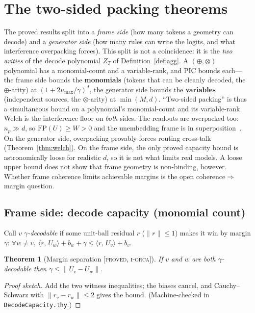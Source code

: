 \documentclass[11pt]{article}
\theoremstyle{definition}
\theoremstyle{plain}
\newtheorem{theorem}{Theorem}[section]
\theoremstyle{remark}
\newcommand{\proved}{\textsc{[proved, i-orca]}}
\newcommand{\inner}[2]{\langle #1,\, #2\rangle}
\newcommand{\umax}{u_{\max}}
\begin{document}
\section{The two-sided packing theorems}\label{sec:thm}

The proved results split into a \emph{frame side} (how many tokens a geometry can decode) and a
\emph{generator side} (how many rules can write the logits, and what interference overpacking forces).
This split is not a coincidence: it is the \emph{two arities} of the decode polynomial $Z_T$ of
Definition~\ref{def:agg}. A $(\oplus,\otimes)$ polynomial has a monomial-count and a variable-rank, and
PIC bounds each---the frame side bounds the \textbf{monomials} (tokens that can be cleanly decoded, the
$\oplus$-arity) at $(1+2\umax/\gamma)^d$, the generator side bounds the \textbf{variables} (independent
sources, the $\otimes$-arity) at $\min(M,d)$. ``Two-sided packing'' is thus a simultaneous bound on a
polynomial's monomial-count and its variable-rank. Welch is the interference floor on \emph{both} sides.
The readouts are overpacked too: $n_p\gg d$, so $\mathrm{FP}(U)\ge W>0$ and the unembedding frame is in
superposition~\cite{elhage2022superposition}. On the generator side, overpacking provably forces routing cross-talk
(Theorem~\ref{thm:welch}). On the frame side, the only proved capacity bound is astronomically loose for
realistic $d$, so it is not what limits real models. A loose upper bound does not show that frame geometry
is non-binding, however. Whether frame coherence limits achievable margins is the open
coherence$\Rightarrow$margin question.

\subsection{Frame side: decode capacity (monomial count)}

Call $v$ \emph{$\gamma$-decodable} if some unit-ball residual $r$ ($\lVert r\rVert\le1$) makes it win by
margin $\gamma$: $\forall w\neq v,\ \inner{r}{U_w}+b_w+\gamma\le\inner{r}{U_v}+b_v$.

\begin{theorem}[Margin separation \proved{}]\label{thm:sep}
If $v$ and $w$ are both $\gamma$-decodable then $\gamma\le\lVert U_v-U_w\rVert$.
\end{theorem}
\begin{proof}[Proof sketch]
Add the two witness inequalities; the biases cancel, and Cauchy--Schwarz with $\lVert r_v-r_w\rVert\le2$
gives the bound. (Machine-checked in \texttt{DecodeCapacity.thy}.)
\end{proof}
\end{document}
